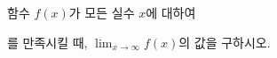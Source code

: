 함수 $f(x)$가 모든 실수 $x$에 대하여\par\smallskip{}\par\smallskip\noindent 를 만족시킬 때, $\displaystyle\lim_{x\to\infty} f(x)$의 값을 구하시오.
